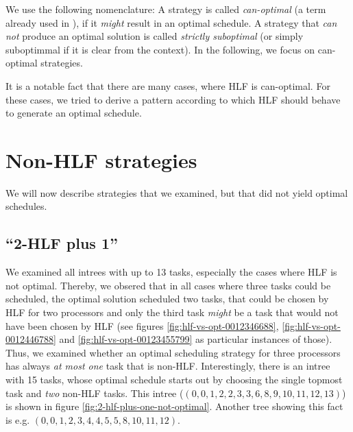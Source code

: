 We use the following nomenclature: A strategy is called \emph{can-optimal} (a term already used in \cite{MoritzMaasDiploma}), if it \emph{might} result in an optimal schedule. A strategy that \emph{can not} produce an optimal solution is called \emph{strictly suboptimal} (or simply suboptimmal if it is clear from the context). In the following, we focus on can-optimal strategies.

It is a notable fact that there are many cases, where HLF is can-optimal. For these cases, we tried to derive a pattern according to which HLF should behave to generate an optimal schedule.

\section{Non-HLF strategies}
\label{sec:suboptimal-non-hlf-strategies}

We will now describe strategies that we examined, but that did not yield optimal schedules.

\subsection{``2-HLF plus 1''}
\label{sec:disproving-2hlf-plus-1}

We examined all intrees with up to 13 tasks, especially the cases where HLF is not optimal. Thereby, we obsered that in all cases where three tasks could be scheduled, the optimal solution scheduled two tasks, that could be chosen by HLF for two processors and only the third task \emph{might} be a task that would not have been chosen by HLF (see figures \ref{fig:hlf-vs-opt-0012346688}, \ref{fig:hlf-vs-opt-0012446788} and \ref{fig:hlf-vs-opt-00123455799} as particular instances of those). Thus, we examined whether an optimal scheduling strategy for three processors has always \emph{at most one} task that is non-HLF. Interestingly, there is an intree with 15 tasks, whose optimal schedule starts out by choosing the single topmost task and \emph{two} non-HLF tasks. This intree ($(0,0,1,2,2,3,3,6,8,9,10,11,12,13)$) is shown in figure \ref{fig:2-hlf-plus-one-not-optimal}. Another tree showing this fact is e.g. $(0, 0, 1, 2, 3, 4, 4, 5, 5, 8, 10, 11, 12)$.

